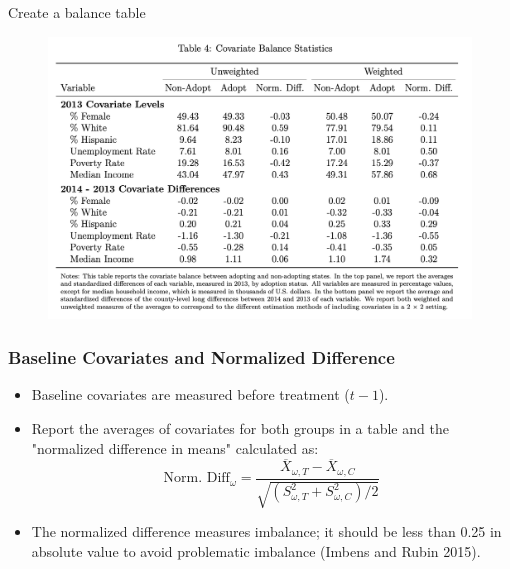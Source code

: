 \documentclass{beamer}
\begin{document}
\begin{frame}{Create a balance table}

\begin{figure}
    \centering
    \includegraphics[height=0.80\textheight]{./lecture_includes/step6_imbalance}
\end{figure}

\end{frame}


\begin{frame}
    \frametitle{Baseline Covariates and Normalized Difference}
    \begin{itemize}
        \item Baseline covariates are measured before treatment ($t-1$).
        \item Report the averages of covariates for both groups in a table and the "normalized difference in means" calculated as:
        $$ \text{Norm. Diff}_\omega = \frac{\overline{X}_{\omega,T} - \overline{X}_{\omega,C}}{\sqrt{(S_{\omega,T}^2 + S_{\omega,C}^2)/2}} $$
        \item The normalized difference measures imbalance; it should be less than 0.25 in absolute value to avoid problematic imbalance (Imbens and Rubin 2015).
    \end{itemize}
\end{frame}
\end{document}
